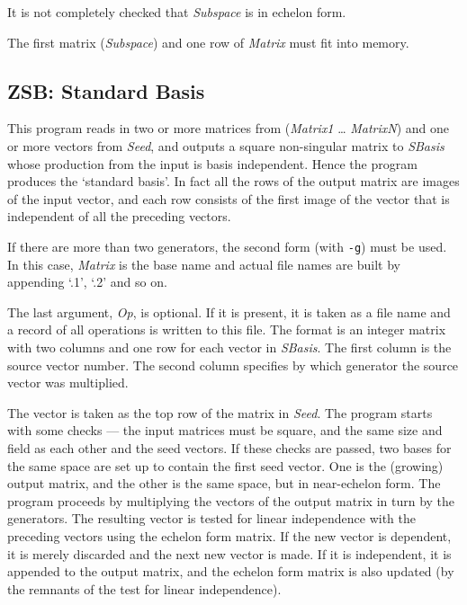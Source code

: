 \Bugs
It is not completely checked that {\it Subspace} is in echelon form.

\Limits
The first matrix ({\it Subspace}) and one row of {\it Matrix} must
fit into memory.


\subsection{ZSB: Standard Basis}
\Syntax
{}

\Description
This program reads in two or more matrices from ({\it Matrix1} \ldots %
{\it MatrixN}) and one or more vectors from {\it Seed}, and outputs a
square non-singular matrix to {\it SBasis} whose production from the
input is basis independent.
Hence the program produces the `standard basis'. In fact all the rows
of the output matrix are images of the input vector, and each row
consists of the first image of the vector that is independent of all
the preceding vectors.

If there are more than two generators, the second form (with
{\tt -g}) must be used. In this case, {\it Matrix} is the base
name and actual file names are built by appending `.1', `.2'
and so on.

The last argument, {\it Op}, is optional. If it is present, it is
taken as a file name and a record of all operations is written to
this file. The format is an integer matrix with two columns and
one row for each vector in {\it SBasis}. The first column is the
source vector number. The second column specifies by which generator
the source vector was multiplied. 

The vector is taken as the top row of the matrix in {\it Seed}. The
program starts with some checks --- the input matrices must be square,
and the same size and field as each other and the seed vectors.
If these checks are passed, two bases for the same space are set up to
contain the first seed vector. One is the (growing) output matrix, and
the other is the same space, but in near-echelon form. The program
proceeds by multiplying the vectors of the output matrix in turn by the
generators. The resulting vector is tested for linear independence with
the preceding vectors using the echelon form matrix. If the new vector
is dependent, it is merely discarded and the next new vector is made.
If it is independent, it is appended to the output matrix, and the
echelon form matrix is also updated (by the remnants of the test for
linear independence).

